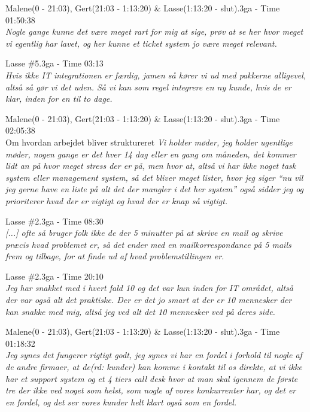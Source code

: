 \begin{thebibliography}{9}
	Malene(0 - 21:03), Gert(21:03 - 1:13:20) \& Lasse(1:13:20 - slut).3ga - Time 01:50:38\\
	\textit{Nogle gange kunne det være meget rart for mig at sige, prøv at se her hvor meget vi egentlig har lavet, og her kunne et ticket system jo være meget relevant.}

	Lasse \#5.3ga - Time 03:13 \\
	\textit{Hvis ikke IT integrationen er færdig, jamen så kører vi ud med pakkerne alligevel, altså så gør vi det uden. Så vi kan som regel integrere en ny kunde, hvis de er klar, inden for en til to dage.}

	Malene(0 - 21:03), Gert(21:03 - 1:13:20) \& Lasse(1:13:20 - slut).3ga - Time 02:05:38\\
	Om hvordan arbejdet bliver struktureret \textit{Vi holder møder, jeg holder ugentlige møder, nogen gange er det hver 14 dag eller en gang om måneden, det kommer lidt an på hvor meget stress der er på, men hvor at, altså vi har ikke noget task system eller management system, så det bliver meget lister, hvor jeg siger “nu vil jeg gerne have en liste på alt det der mangler i det her system” også sidder jeg og prioriterer hvad der er vigtigt og hvad der er knap så vigtigt.}

	Lasse \#2.3ga - Time 08:30\\
	\textit{[...] ofte så bruger folk ikke de der 5 minutter på at skrive en mail og skrive præcis hvad problemet er, så det ender med en mailkorrespondance på 5 mails frem og tilbage, for at finde ud af hvad problemstillingen er.}

	Lasse \#2.3ga - Time 20:10\\
	\textit{Jeg har snakket med i hvert fald 10 og det var kun inden for IT området, altså der var også alt det praktiske. Der er det jo smart at der er 10 mennesker der kan snakke med mig, altså jeg ved alt det 10 mennesker ved på deres side.}

	Malene(0 - 21:03), Gert(21:03 - 1:13:20) \& Lasse(1:13:20 - slut).3ga - Time 01:18:32\\
	\textit{Jeg synes det fungerer rigtigt godt, jeg synes vi har en fordel i forhold til nogle af de andre firmaer, at de\emph{(rd: kunder)} kan komme i kontakt til os direkte, at vi ikke har et support system og et 4 tiers call desk hvor at man skal igennem de første tre der ikke ved noget som helst, som nogle af vores konkurrenter har, og det er en fordel, og det ser vores kunder helt klart også som en fordel.}


\end{thebibliography}
